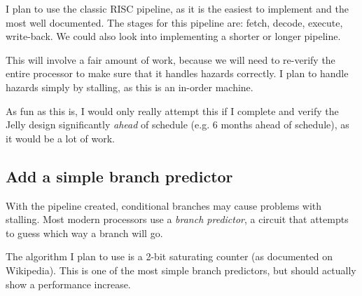 \documentclass{article}
\begin{document}
I plan to use the classic RISC pipeline, as it is the easiest to implement and the most well documented. The
stages for this pipeline are: fetch, decode, execute, write-back. We could also look into implementing a
shorter or longer pipeline.

This will involve a fair amount of work, because we will need to re-verify the entire processor to make sure
that it handles hazards correctly. I plan to handle hazards simply by stalling, as this is an in-order
machine.

As fun as this is, I would only really attempt this if I complete and verify the Jelly design significantly
\textit{ahead} of schedule (e.g. 6 months ahead of schedule), as it would be a lot of work.

\subsection{Add a simple branch predictor}
With the pipeline created, conditional branches may cause problems with stalling. Most modern processors use
a \textit{branch predictor}, a circuit that attempts to guess which way a branch will go.

The algorithm I plan to use is a 2-bit saturating counter (as documented on Wikipedia). This is one of the
most simple branch predictors, but should actually show a performance increase.




\end{document}
